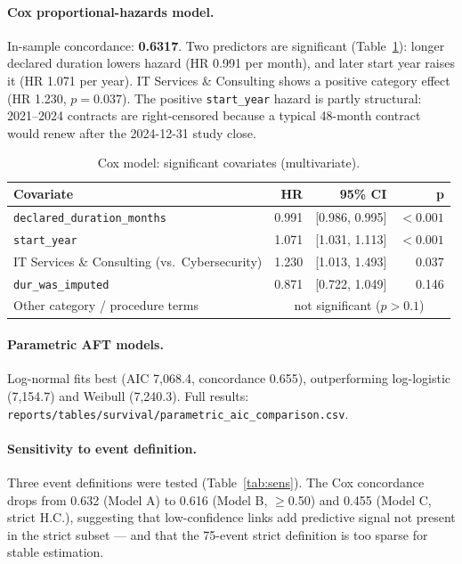 \documentclass[11pt,a4paper]{article}
\begin{document}
\paragraph{Cox proportional-hazards model.} In-sample concordance:
\textbf{0.6317}. Two predictors are significant (Table~\ref{tab:cox}): longer
declared duration lowers hazard (HR 0.991 per month), and later start year
raises it (HR 1.071 per year). IT Services \& Consulting shows a positive
category effect (HR 1.230, $p=0.037$). The positive
\texttt{start\_year} hazard is partly structural: 2021--2024 contracts are
right-censored because a typical 48-month contract would renew after the
2024-12-31 study close.

\begin{table}[H]
\centering
\caption{Cox model: significant covariates (multivariate).}
\label{tab:cox}
\small
\begin{tabular}{@{}lrrr@{}}
\toprule
\textbf{Covariate} & \textbf{HR} & \textbf{95\% CI} & \textbf{p} \\
\midrule
\texttt{declared\_duration\_months} & 0.991 & [0.986, 0.995] & $<0.001$ \\
\texttt{start\_year}                & 1.071 & [1.031, 1.113] & $<0.001$ \\
IT Services \& Consulting (vs.\ Cybersecurity) & 1.230 & [1.013, 1.493] & 0.037 \\
\texttt{dur\_was\_imputed}          & 0.871 & [0.722, 1.049] & 0.146 \\
Other category / procedure terms    & \multicolumn{3}{c}{not significant ($p>0.1$)} \\
\bottomrule
\end{tabular}
\end{table}

\paragraph{Parametric AFT models.} Log-normal fits best (AIC 7{,}068.4,
concordance 0.655), outperforming log-logistic (7{,}154.7) and Weibull
(7{,}240.3). Full results:
\nolinkurl{reports/tables/survival/parametric_aic_comparison.csv}.

\paragraph{Sensitivity to event definition.} Three event definitions were tested
(Table~\ref{tab:sens}). The Cox concordance drops from 0.632 (Model A) to 0.616
(Model B, $\geq$0.50) and 0.455 (Model C, strict H.C.), suggesting that
low-confidence links add predictive signal not present in the strict subset ---
and that the 75-event strict definition is too sparse for stable estimation.
\end{document}

